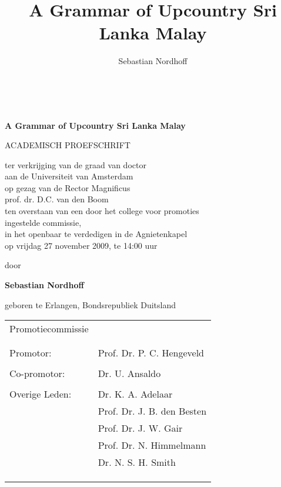 \documentclass[12pt,a4paper,twoside,final]{book} %
\author{Sebastian Nordhoff}
\title{A Grammar of Upcountry Sri Lanka Malay}
\begin{document}
\pagestyle{empty} 
\begin{center}
~
\vspace{3cm}

{\Huge \bf A Grammar of Upcountry Sri Lanka Malay}


\vspace{3cm}

{\large ACADEMISCH PROEFSCHRIFT}


\vspace{1cm}

ter verkrijging van de graad van doctor\\
aan de Universiteit van Amsterdam\\
op gezag van de Rector Magnificus\\
prof. dr. D.C. van den Boom\\
ten overstaan van een door het college voor promoties \\
ingestelde commissie,\\
in het openbaar te verdedigen in de  Agnietenkapel\\
op vrijdag 27 november 2009, te 14:00 uur\\

\vspace{1cm}

door

\vspace{1cm}

{\large \bf Sebastian Nordhoff}

\vspace{1cm}

geboren te Erlangen, Bondsrepubliek Duitsland

 
\end{center} 

\newpage 
\begin{tabular}{ll}
Promotiecommissie\\
\\
\\
Promotor: 		& Prof. Dr. P. C. Hengeveld\\
\\
Co-promotor:		& Dr. U. Ansaldo		\\
\\
Overige Leden: & Dr.  K. A. Adelaar\\
& Prof. Dr. J. B. den Besten\\
& Prof. Dr. J. W. Gair\\
& Prof. Dr. N. Himmelmann\\
& Dr. N. S. H. Smith\\
\\
\\
\\
\end{tabular}
\\
\end{document}
